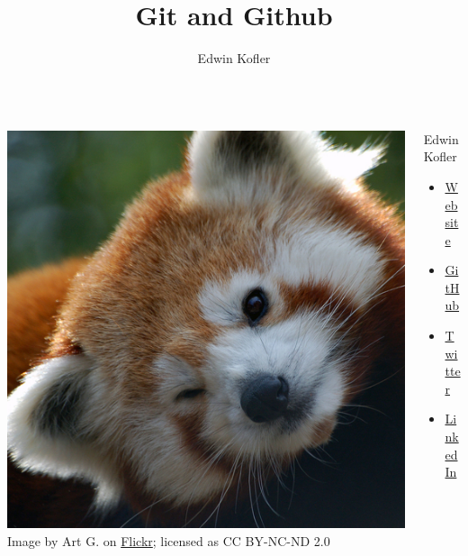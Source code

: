 \documentclass{beamer}
\title{Git and Github}
\author{Edwin Kofler}
\begin{document}
\frame{\titlepage}

\begin{frame}
	\begin{columns}
		\begin{column}{0.48\textwidth}
			\includegraphics{panda-500px.jpg} \newline
			{ \tiny Image by Art G. on \href{https://www.flickr.com/photos/digitalart/4084550022}{Flickr}; licensed as CC BY-NC-ND 2.0 }
	  \end{column}
	  \begin{column}{0.48\textwidth}
			{\Huge Edwin Kofler} \newline
			\begin{itemize}
				\item \href{https://edwinkofler.com/}{Website}
				\item \href{https://github.com/hyperupcall}{GitHub}
				\item \href{https://twitter.com/hyperupcall}{Twitter}
				\item \href{https://www.linkedin.com/in/hyperupcall}{LinkedIn}
			\end{itemize}
	  \end{column}
	\end{columns}
\end{frame}
\end{document}
